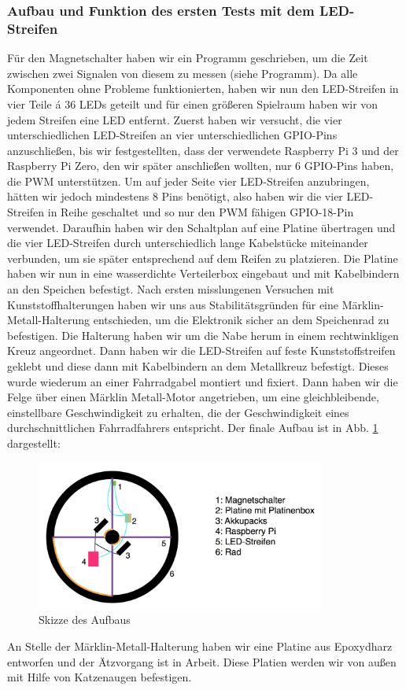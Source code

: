 \documentclass [a4paper, 11pt] {article}
\begin{document}
\subsubsection{Aufbau und Funktion des ersten Tests mit dem LED-Streifen}
Für den Magnetschalter haben wir ein Programm geschrieben, um die Zeit zwischen zwei Signalen von diesem zu messen (siehe Programm).
Da alle Komponenten ohne Probleme funktionierten, haben wir nun den LED-Streifen in vier Teile á 36 LEDs geteilt und für einen größeren Spielraum haben wir von jedem Streifen eine LED entfernt. Zuerst haben wir versucht, die vier unterschiedlichen LED-Streifen an vier unterschiedlichen GPIO-Pins anzuschließen, bis wir festgestellten, dass der verwendete Raspberry Pi 3 und der Raspberry Pi Zero, den wir später anschließen wollten, nur 6 GPIO-Pins haben, die PWM unterstützen. Um auf jeder Seite vier LED-Streifen anzubringen, hätten wir jedoch mindestens 8 Pins benötigt, also haben wir die vier LED-Streifen in Reihe geschaltet und so nur den PWM fähigen GPIO-18-Pin verwendet.
Daraufhin haben wir den Schaltplan auf eine Platine übertragen und die vier LED-Streifen durch unterschiedlich lange Kabelstücke miteinander verbunden, um sie später entsprechend auf dem Reifen zu platzieren. Die Platine haben wir nun in eine wasserdichte Verteilerbox eingebaut und mit Kabelbindern an den Speichen befestigt.
Nach ersten misslungenen Versuchen mit Kunststoffhalterungen haben wir uns aus Stabilitätsgründen für eine Märklin-Metall-Halterung entschieden, um die Elektronik sicher an dem Speichenrad zu befestigen. Die Halterung haben wir um die Nabe herum in einem rechtwinkligen Kreuz angeordnet. Dann haben wir die LED-Streifen auf feste Kunststoffstreifen geklebt und diese dann mit Kabelbindern an dem Metallkreuz befestigt. Dieses wurde wiederum an einer Fahrradgabel montiert und fixiert. Dann haben wir die Felge über einen Märklin Metall-Motor angetrieben, um eine gleichbleibende, einstellbare Geschwindigkeit zu erhalten, die der Geschwindigkeit eines durchschnittlichen Fahrradfahrers entspricht. Der finale Aufbau ist in Abb. \ref{Skizze} dargestellt:
\begin{figure}[H]
	\centering
	\includegraphics[width=9.5cm]{Rad.png}
	\caption{Skizze des Aufbaus}
	\label{Skizze}
\end{figure}
An Stelle der Märklin-Metall-Halterung haben wir eine Platine aus Epoxydharz entworfen und der Ätzvorgang ist in Arbeit. Diese Platien werden wir von außen mit Hilfe von Katzenaugen befestigen.  
\end{document}
